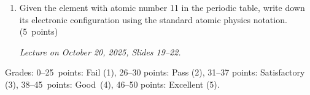 \documentclass[a4paper,12pt]{letter}
\begin{document}
\begin{enumerate}[label=\Roman*.]
\begin{enumerate}[label=\arabic*.]
\smallskip
\textit{Lecture on October 20, 2025, Slides 16--17.}

\item Given the element with atomic number 11 in the periodic table, write down its electronic configuration using the standard atomic physics notation. \hfill (5~points)

\smallskip
\textit{Lecture on October 20, 2025, Slides 19--22.}
  
\end{enumerate}

\end{enumerate}


Grades: 0–25~points: Fail (1), 26–30 points: Pass (2), 31–37 points: Satisfactory (3), 38–45~points: Good~(4), 46–50 points: Excellent (5).


\vfill
\end{document}
